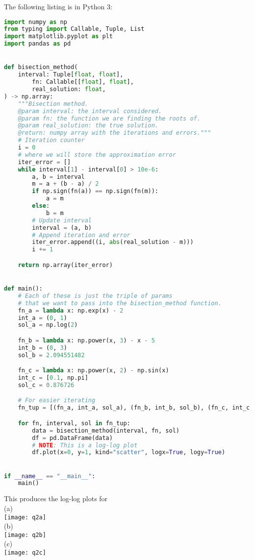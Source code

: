 \documentclass{article}
\begin{document}
The following listing is in Python 3:
\begin{lstlisting}[language=Python, basicstyle=\small]
import numpy as np
from typing import Callable, Tuple, List
import matplotlib.pyplot as plt
import pandas as pd


def bisection_method(
    interval: Tuple[float, float],
        fn: Callable[[float], float],
        real_solution: float,
) -> np.array:
    """Bisection method.
    @param interval: the interval considered.
    @param fn: the function we are finding the roots of.
    @param real_solution: the true solution.
    @return: numpy array with the iterations and errors."""
    # Iteration counter
    i = 0
    # where we will store the approximation error
    iter_error = []
    while interval[1] - interval[0] > 10e-6:
        a, b = interval
        m = a + (b - a) / 2
        if np.sign(fn(a)) == np.sign(fn(m)):
            a = m
        else:
            b = m
        # Update interval
        interval = (a, b)
        # Append iteration and error
        iter_error.append((i, abs(real_solution - m)))
        i += 1

    return np.array(iter_error)


def main():
    # Each of these is just the triple of params
    # that we want to pass into the bisection_method function.
    fn_a = lambda x: np.exp(x) - 2
    int_a = (0, 1)
    sol_a = np.log(2)

    fn_b = lambda x: np.power(x, 3) - x - 5
    int_b = (0, 3)
    sol_b = 2.094551482

    fn_c = lambda x: np.power(x, 2) - np.sin(x)
    int_c = [0.1, np.pi]
    sol_c = 0.876726

    # For easier iterating
    fn_tup = [(fn_a, int_a, sol_a), (fn_b, int_b, sol_b), (fn_c, int_c, sol_c)]

    for fn, interval, sol in fn_tup:
        data = bisection_method(interval, fn, sol)
        df = pd.DataFrame(data)
        # NOTE: This is a log-log plot
        df.plot(x=0, y=1, kind="scatter", logx=True, logy=True)


if __name__ == "__main__":
    main()
\end{lstlisting}

This produces the log-log plots for\\
(a) \\ \texttt{[image: q2a]}\\
(b) \\ \texttt{[image: q2b]}\\
(c) \\ \texttt{[image: q2c]}
\end{document}
